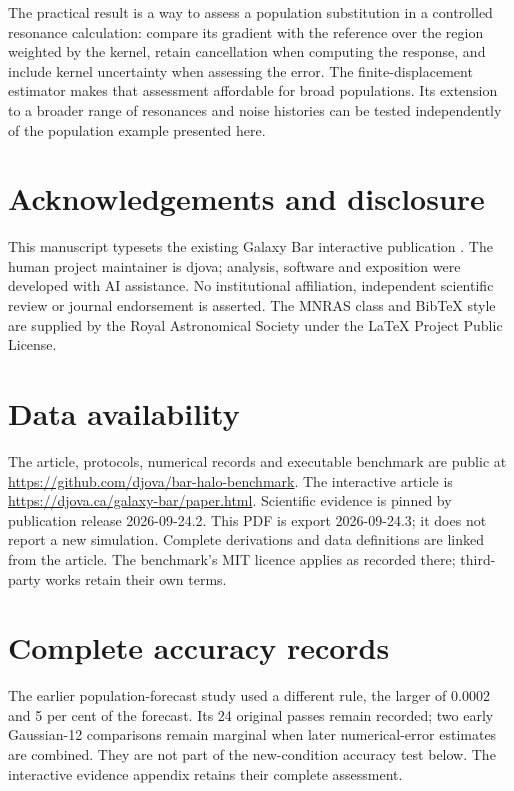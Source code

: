 \documentclass[fleqn,usenatbib]{mnras}
\begin{document}
\protect{}\label{conclusions}{} The practical result is a way to assess a population substitution in a controlled resonance calculation: compare its gradient with the reference over the region weighted by the kernel, retain cancellation when computing the response, and include kernel uncertainty when assessing the error. The finite-displacement estimator makes that assessment affordable for broad populations. Its extension to a broader range of resonances and noise histories can be tested independently of the population example presented here.

\section*{Acknowledgements and disclosure}
This manuscript typesets the existing Galaxy Bar interactive publication \citep{GalaxyBar2026}. The human project maintainer is djova; analysis, software and exposition were developed with AI assistance. No institutional affiliation, independent scientific review or journal endorsement is asserted. The MNRAS class and BibTeX style are supplied by the Royal Astronomical Society under the LaTeX Project Public License.
\section*{Data availability}
The article, protocols, numerical records and executable benchmark are public at \url{https://github.com/djova/bar-halo-benchmark}. The interactive article is \url{https://djova.ca/galaxy-bar/paper.html}. Scientific evidence is pinned by publication release 2026-09-24.2. This PDF is export 2026-09-24.3; it does not report a new simulation. Complete derivations and data definitions are linked from the article. The benchmark's MIT licence applies as recorded there; third-party works retain their own terms.


\clearpage
\onecolumn
\makeatletter
\def\fps@table{!h}
\makeatother
\appendix
\renewcommand{\theHtable}{\thesection.\arabic{table}}
\section{Complete accuracy records}\label{app-accuracy}

The earlier population-forecast study used a different rule, the larger of 0.0002 and 5 per cent of the forecast. Its 24 original passes remain recorded; two early Gaussian-12 comparisons remain marginal when later numerical-error estimates are combined. They are not part of the new-condition accuracy test below. The interactive evidence appendix retains their complete assessment.
\end{document}
